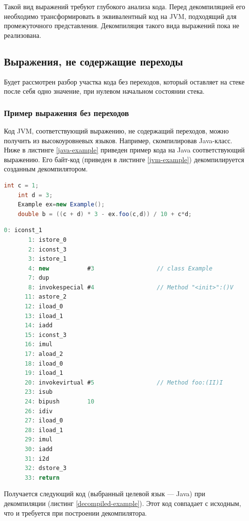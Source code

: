 \documentclass[14pt]{extarticle}
\begin{document}
Такой вид выражений требуют глубокого анализа кода. Перед декомпиляцией его необходимо трансформировать в эквивалентный код на JVM, подходящий для промежуточного представления. Декомпиляция такого вида выражений пока не реализована. 

\subsection{Выражения, не содержащие переходы}
Будет рассмотрен разбор участка кода без переходов, который оставляет на стеке после себя одно значение, при нулевом начальном состоянии стека. 

\subsubsection*{Пример выражения без переходов}
Код JVM, соответствующий выражению, не содержащий переходов, можно получить из высокоуровневых языков. Например, скомпилировав Java-класс. Ниже в листинге \ref{java-example} приведен пример кода на Java соответствующий выражению. Его байт-код (приведен в листинге \ref{jvm-example}) декомпилируется созданным декомпилятором. 

\begin{lstlisting}[label=java-example,caption = Пример кода выражения в Java без переходов, frame = single, language = JAVA]
	int c = 1; 
 	int d = 3; 
	Example ex=new Example();
 	double b = ((c + d) * 3 - ex.foo(c,d)) / 10 + c*d; 
\end{lstlisting}

\begin{lstlisting}[label=jvm-example,caption = Пример кода выражения в JVM без переходов, frame = single, language = JAVA]
       0: iconst_1
       1: istore_0
       2: iconst_3
       3: istore_1
       4: new           #3                  // class Example
       7: dup
       8: invokespecial #4                  // Method "<init>":()V
      11: astore_2
      12: iload_0
      13: iload_1
      14: iadd
      15: iconst_3
      16: imul
      17: aload_2
      18: iload_0
      19: iload_1
      20: invokevirtual #5                  // Method foo:(II)I
      23: isub
      24: bipush        10
      26: idiv
      27: iload_0
      28: iload_1
      29: imul
      30: iadd
      31: i2d
      32: dstore_3
      33: return
\end{lstlisting}

Получается следующий код (выбранный целевой язык --- Java) при декомпиляции (листинг \ref{decompiled-example}). Этот код совпадает с исходным, что и требуется при построении декомпилятора.
\end{document}
